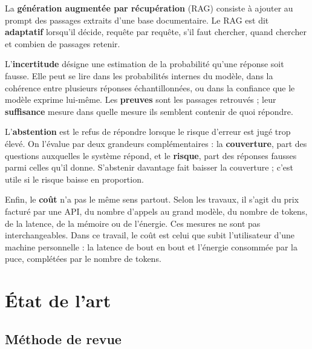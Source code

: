 \documentclass[11pt,a4paper]{article}
\begin{document}
La \textbf{génération augmentée par récupération} (RAG) consiste à ajouter au prompt des passages
extraits d'une base documentaire. Le RAG est dit \textbf{adaptatif} lorsqu'il décide, requête par
requête, s'il faut chercher, quand chercher et combien de passages retenir.

L'\textbf{incertitude} désigne une estimation de la probabilité qu'une réponse soit fausse. Elle peut
se lire dans les probabilités internes du modèle, dans la cohérence entre plusieurs réponses
échantillonnées, ou dans la confiance que le modèle exprime lui-même. Les \textbf{preuves} sont les
passages retrouvés ; leur \textbf{suffisance} mesure dans quelle mesure ils semblent contenir de quoi
répondre.

L'\textbf{abstention} est le refus de répondre lorsque le risque d'erreur est jugé trop élevé. On
l'évalue par deux grandeurs complémentaires \citep{kamath2020selective} : la \textbf{couverture}, part
des questions auxquelles le système répond, et le \textbf{risque}, part des réponses fausses parmi
celles qu'il donne. S'abstenir davantage fait baisser la couverture ; c'est utile si le risque baisse
en proportion.

Enfin, le \textbf{coût} n'a pas le même sens partout. Selon les travaux, il s'agit du prix facturé par
une API, du nombre d'appels au grand modèle, du nombre de tokens, de la latence, de la mémoire ou de
l'énergie. Ces mesures ne sont pas interchangeables. Dans ce travail, le coût est celui que subit
l'utilisateur d'une machine personnelle : la latence de bout en bout et l'énergie consommée par la
puce, complétées par le nombre de tokens.

\section{État de l'art}\label{sec:etat}

\subsection{Méthode de revue}
\end{document}
